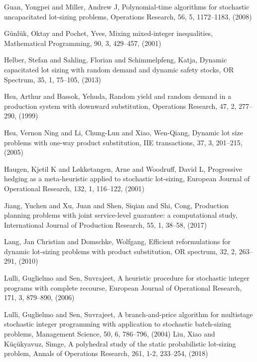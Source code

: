 \documentclass[10pt]{article}
\begin{document}
\begin{thebibliography}{99}
  Guan, Yongpei and Miller, Andrew J, Polynomial-time algorithms for stochastic uncapacitated lot-sizing problems,  Operations Research, 56, 5, 1172--1183,
(2008)

G{\"u}nl{\"u}k, Oktay and Pochet, Yves, Mixing mixed-integer inequalities, Mathematical Programming, 90, 3, 429--457, (2001)


 Helber, Stefan and Sahling, Florian and Schimmelpfeng, Katja, Dynamic capacitated lot sizing with random demand and dynamic safety stocks, OR Spectrum, 35, 1, 75--105, (2013)
 

Hsu, Arthur and Bassok, Yehuda, Random yield and random demand in a production system with downward substitution, Operations Research, 47, 2, 277--290,
  (1999)
  
Hsu, Vernon Ning and Li, Chung-Lun and Xiao, Wen-Qiang, Dynamic lot size problems with one-way product substitution, IIE transactions, 37, 3, 201--215, (2005)

Haugen, Kjetil K and L{\o}kketangen, Arne and Woodruff, David L, Progressive hedging as a meta-heuristic applied to stochastic lot-sizing, European Journal of Operational Research, 132, 1, 116--122, (2001)


 
 Jiang, Yuchen and Xu, Juan and Shen, Siqian and Shi, Cong, Production planning problems with joint service-level guarantee: a computational study, International Journal of Production Research, 55, 1, 38--58,
 (2017)
 
 Lang, Jan Christian and Domschke, Wolfgang, Efficient reformulations for dynamic lot-sizing problems with product substitution, OR spectrum,
32, 2, 263--291, (2010)

 Lulli, Guglielmo and Sen, Suvrajeet, A heuristic procedure for stochastic integer programs with complete recourse, European Journal of Operational Research,
171, 3, 879--890, (2006)

Lulli, Guglielmo and Sen, Suvrajeet, A branch-and-price algorithm for multistage stochastic integer programming with application to stochastic batch-sizing problems, Management Science, 50, 6, 786--796, (2004)
Liu, Xiao and K{\"u}{\c{c}}{\"u}kyavuz, Simge, A polyhedral study of the static probabilistic lot-sizing problem, Annals of Operations Research, 261, 1-2,
233--254, (2018)


\end{thebibliography}
\end{document}

